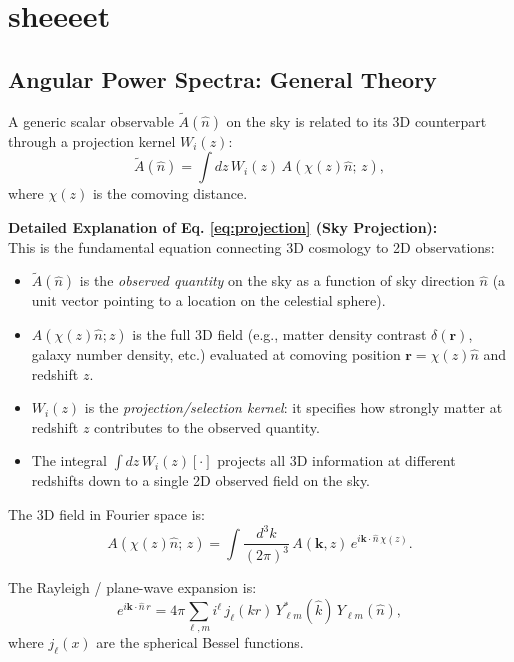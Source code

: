 \section{sheeeet}
\subsection{Angular Power Spectra: General Theory}
A generic scalar observable $\tilde{A}(\hat{n})$ on the sky is related to its 3D
counterpart through a projection kernel $W_i(z)$:
\begin{equation}
    \tilde{A}(\hat{n}) = \int dz\, W_i(z)\, A(\chi(z)\hat{n};\, z),
    \label{eq:projection}
\end{equation}
where $\chi(z)$ is the comoving distance.

\noindent\textbf{Detailed Explanation of Eq. \eqref{eq:projection} (Sky Projection):}\\
This is the fundamental equation connecting 3D cosmology to 2D observations:
\begin{itemize}
    \item $\tilde{A}(\hat{n})$ is the \emph{observed quantity} on the sky as a function of sky direction $\hat{n}$ (a unit vector pointing to a location on the celestial sphere).
    \item $A(\chi(z)\hat{n}; z)$ is the full 3D field (e.g., matter density contrast $\delta(\mathbf{r})$, galaxy number density, etc.) evaluated at comoving position $\mathbf{r} = \chi(z) \hat{n}$ and redshift $z$.
    \item $W_i(z)$ is the \emph{projection/selection kernel}: it specifies how strongly matter at redshift $z$ contributes to the observed quantity.
    \item The integral $\int dz\, W_i(z) [\cdot]$ projects all 3D information at different redshifts down to a single 2D observed field on the sky.
\end{itemize}

The 3D field in Fourier space is:
\begin{equation}
    A(\chi(z)\hat{n};\,z) = \int \frac{d^3k}{(2\pi)^3}\, A(\mathbf{k},z)\,
    e^{i\mathbf{k}\cdot\hat{n}\,\chi(z)}.
\end{equation}

The Rayleigh / plane-wave expansion is:
\begin{equation}
    e^{i\mathbf{k}\cdot\hat{n}\,r} = 4\pi \sum_{\ell,m} i^\ell\,
    j_\ell(kr)\,Y^*_{\ell m}(\hat{k})\,Y_{\ell m}(\hat{n}),
\end{equation}
where $j_\ell(x)$ are the spherical Bessel functions.

